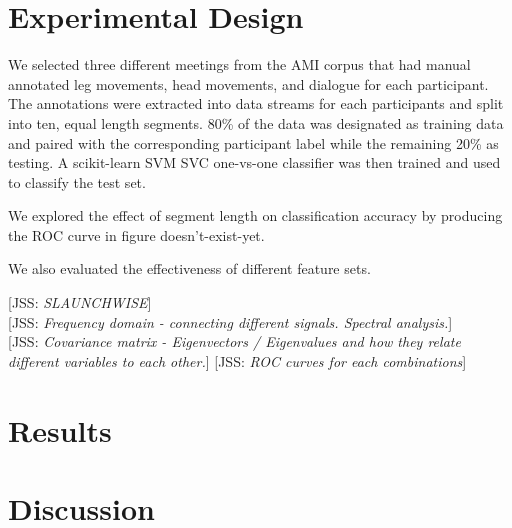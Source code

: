 \documentclass[conference]{IEEEtran}
\newcommand{\meta}[1]{{\textcolor[rgb]{0.1,0.7,0.2}{[JSS: {\it #1}]}}}
\begin{document}
\section{Experimental Design}

We selected three different meetings from the AMI corpus that had manual annotated leg movements, head movements, and dialogue for each participant. The annotations were extracted into data streams for each participants and split into ten, equal length segments. 80\% of the data was designated as training data and paired with the corresponding participant label while the remaining 20\% as testing. A scikit-learn SVM SVC one-vs-one classifier was then trained and used to classify the test set.

We explored the effect of segment length on classification accuracy by producing the ROC curve in figure doesn't-exist-yet. 

We also evaluated the effectiveness of different feature sets. 




\meta{SLAUNCHWISE} \\ 
\meta{Frequency domain - connecting different signals. Spectral analysis.} \\
\meta{Covariance matrix - Eigenvectors / Eigenvalues and how they relate different variables to each other.}
\meta{ROC curves for each combinations}



\section{Results}

\section{Discussion}



\end{document}
